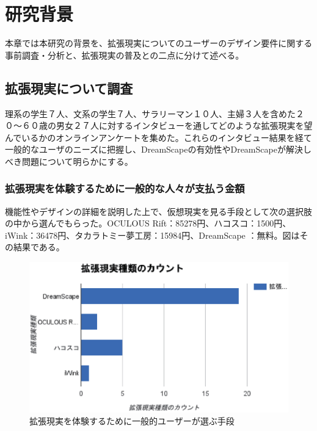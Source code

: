 \chapter{研究背景}
\label{chap:webapi}

本章では本研究の背景を、拡張現実についてのユーザーのデザイン要件に関する事前調査・分析と、拡張現実の普及との二点に分けて述べる。

\section{拡張現実について調査}
理系の学生７人、文系の学生７人、サラリーマン１０人、主婦３人を含めた２０〜６０歳の男女２７人に対するインタビューを通してどのような拡張現実を望んでいるかのオンラインアンケートを集めた。これらのインタビュー結果を経て一般的なユーザのニーズに把握し、DreamScapeの有効性やDreamScapeが解決しべき問題について明らかにする。

\subsection{拡張現実を体験するために一般的な人々が支払う金額}
機能性やデザインの詳細を説明した上で、仮想現実を見る手段として次の選択肢の中から選んでもらった。OCULOUS Rift：85278円、ハコスコ：1500円、iWink：36478円、タカラトミー夢工房：15984円、DreamScape ：無料。図はその結果である。

\begin{figure}[htbp]
\begin{center}
\includegraphics[width=15cm]{eps/VRselection.eps}
\caption{拡張現実を体験するために一般的ユーザーが選ぶ手段}
\label{拡張現実を体験するために一般的ユーザーが選ぶ手段}
\end{center}
\end{figure}

